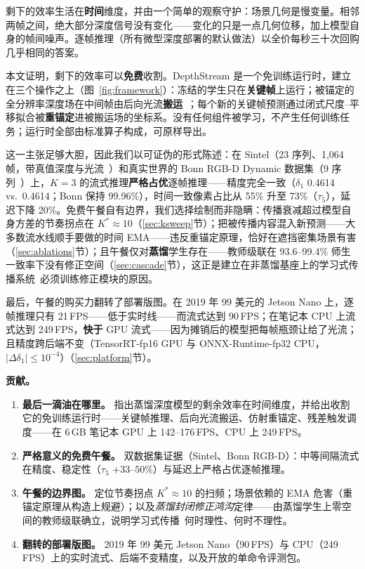 \documentclass[10pt,twocolumn]{article}
\begin{document}
剩下的效率生活在\textbf{时间}维度，并由一个简单的观察守护：场景几何是慢变量。相邻两帧之间，绝大部分深度信号没有变化——变化的只是一点几何位移，加上模型自身的帧间噪声。逐帧推理（所有微型深度部署的默认做法）以全价每秒三十次回购几乎相同的答案。

本文证明，剩下的效率可以\textbf{免费}收割。DepthStream 是一个免训练运行时，建立在三个操作之上（图~\ref{fig:framework}）：冻结的学生只在\textbf{关键帧}上运行；被锚定的全分辨率深度场在中间帧由后向光流\textbf{搬运}~\cite{disflow}；每个新的关键帧预测通过闭式尺度--平移拟合被\textbf{重锚定}进被搬运场的坐标系。没有任何组件被学习，不产生任何训练任务；运行时全部由标准算子构成，可原样导出。

这一主张足够大胆，因此我们以可证伪的形式陈述：在 Sintel（23 序列、1{,}064 帧，带真值深度与光流~\cite{sintel}）和真实世界的 Bonn RGB-D Dynamic 数据集（9 序列~\cite{bonn}）上，$K{=}3$ 的流式推理\textbf{严格占优}逐帧推理——精度完全一致（$\delta_1$ 0.4614 vs.\ 0.4614；Bonn 保持 99.96\%），时间一致像素占比从 55\% 升至 73\%（$\tau_5$），延迟下降 20\%。免费午餐自有边界，我们选择绘制而非隐瞒：传播衰减超过模型自身方差的节奏拐点在 $K^*{\approx}10$（\ref{sec:ksweep}节）；把被传播内容混入新预测——大多数流水线顺手要做的时间 EMA——违反重锚定原理，恰好在遮挡密集场景有害（\ref{sec:ablations}节）；且午餐仅对\textbf{蒸馏}学生存在——教师级联在 93.6--99.4\% 师生一致率下没有修正空间（\ref{sec:cascade}节），这正是建立在非蒸馏基座上的学习式传播系统~\cite{velodepth}必须训练修正模块的原因。

最后，午餐的购买力翻转了部署版图。在 2019 年 99 美元的 Jetson Nano 上，逐帧推理只有 21\,FPS——低于实时线——而流式达到 90\,FPS；在笔记本 CPU 上流式达到 249\,FPS，\textbf{快于} GPU 流式——因为摊销后的模型把每帧瓶颈让给了光流；且精度跨后端不变（TensorRT-fp16 GPU 与 ONNX-Runtime-fp32 CPU，$|\Delta\delta_1|\leq10^{-4}$）（\ref{sec:platform}节）。

\noindent\textbf{贡献。}
\begin{enumerate}
  \item \textbf{最后一滴油在哪里。} 指出蒸馏深度模型的剩余效率在时间维度，并给出收割它的免训练运行时——关键帧推理、后向光流搬运、仿射重锚定、残差触发调度——在 6\,GB 笔记本 GPU 上 142--176\,FPS、CPU 上 249\,FPS。
  \item \textbf{严格意义的免费午餐。} 双数据集证据（Sintel、Bonn RGB-D）：中等间隔流式在精度、稳定性（$\tau_5$ $+33$--$50\%$）与延迟上严格占优逐帧推理。
  \item \textbf{午餐的边界图。} 定位节奏拐点 $K^*\approx10$ 的扫频；场景依赖的 EMA 危害（重锚定原理从构造上规避）；以及\emph{蒸馏封闭修正鸿沟}定律——由蒸馏学生上零空间的教师级联确立，说明学习式传播~\cite{velodepth}何时理性、何时不理性。
  \item \textbf{翻转的部署版图。} 2019 年 99 美元 Jetson Nano（90\,FPS）与 CPU（249\,FPS）上的实时流式、后端不变精度，以及开放的单命令评测包。
\end{enumerate}
\end{document}
